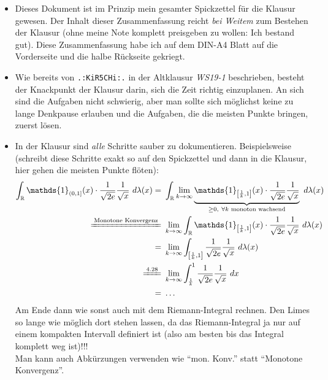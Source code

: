 \begin{itemize}
	\item Dieses Dokument ist im Prinzip mein gesamter Spickzettel für die Klausur gewesen. Der Inhalt dieser Zusammenfassung reicht \emph{bei Weitem} zum Bestehen der Klausur (ohne meine Note komplett preisgeben zu wollen: Ich bestand gut). Diese Zusammenfassung habe ich auf dem DIN-A4 Blatt auf die Vorderseite und die halbe Rückseite gekriegt.

	\item Wie bereits von \texttt{.:KiR5CHi:.} in der Altklausur \emph{WS19-1} beschrieben, besteht der Knackpunkt der Klausur darin, sich die Zeit richtig einzuplanen. An sich sind die Aufgaben nicht schwierig, aber man sollte sich möglichst keine zu lange Denkpause erlauben und die Aufgaben, die die meisten Punkte bringen, zuerst lösen.

	\item In der Klausur sind \emph{alle} Schritte sauber zu dokumentieren. Beispielsweise (schreibt diese Schritte exakt so auf den Spickzettel und dann in die Klausur, hier gehen die meisten Punkte flöten):
	\begin{align*}
		\int_{\R} \mathds{1}_{(0,1]}(x)\cdot\frac{1}{\sqrt{2e}}\frac{1}{\sqrt{x}}~d\lambda(x)=\ &\int_{\R} \limfty{k}\underbrace{\mathds{1}_{\left[\frac{1}{k},1\right]}(x)\cdot\frac{1}{\sqrt{2e}}\frac{1}{\sqrt{x}}}_{\geq 0,~\forall k \text{ monoton wachsend}}~d\lambda(x)\\
		\xlongequal{\text{Monotone Konvergenz}}\ &\limfty{k}\int_{\R}\mathds{1}_{\left[\frac{1}{k},1\right]}(x)\cdot\frac{1}{\sqrt{2e}}\frac{1}{\sqrt{x}}~d\lambda(x)\\
		=\ &\limfty{k}\int_{\left[\frac{1}{k},1\right]}\frac{1}{\sqrt{2e}}\frac{1}{\sqrt{x}}~d\lambda(x)\\
		\xlongequal{\text{4.28}}\ &\limfty{k}\int_{\frac{1}{k}}^1 \frac{1}{\sqrt{2e}}\frac{1}{\sqrt{x}}~dx\\
		=\ &\ldots
	\end{align*}
	Am Ende dann wie sonst auch mit dem Riemann-Integral rechnen. Den Limes so lange wie möglich dort stehen lassen, da das Riemann-Integral ja nur auf einem kompakten Intervall definiert ist (also am besten bis das Integral komplett weg ist)!!!\\
    Man kann auch Abkürzungen verwenden wie ``mon. Konv.'' statt ``Monotone Konvergenz''.
\end{itemize}
